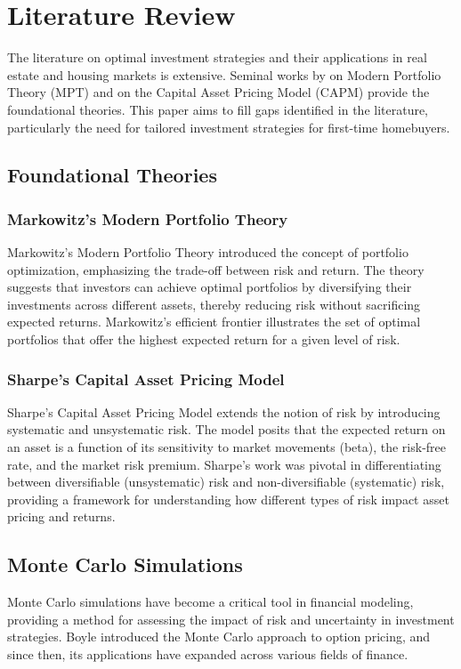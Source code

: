 \section{Literature Review}

The literature on optimal investment strategies and their applications in real estate and housing markets is extensive. Seminal works by \citet{markowitz1952portfolio} on Modern Portfolio Theory (MPT) and \citet{sharpe1964capital} on the Capital Asset Pricing Model (CAPM) provide the foundational theories. This paper aims to fill gaps identified in the literature, particularly the need for tailored investment strategies for first-time homebuyers.

\subsection{Foundational Theories}

\subsubsection{Markowitz's Modern Portfolio Theory}
Markowitz's Modern Portfolio Theory \citep{markowitz1952portfolio} introduced the concept of portfolio optimization, emphasizing the trade-off between risk and return. The theory suggests that investors can achieve optimal portfolios by diversifying their investments across different assets, thereby reducing risk without sacrificing expected returns. Markowitz's efficient frontier illustrates the set of optimal portfolios that offer the highest expected return for a given level of risk.

\subsubsection{Sharpe's Capital Asset Pricing Model}
Sharpe's Capital Asset Pricing Model \citep{sharpe1964capital} extends the notion of risk by introducing systematic and unsystematic risk. The model posits that the expected return on an asset is a function of its sensitivity to market movements (beta), the risk-free rate, and the market risk premium. Sharpe's work was pivotal in differentiating between diversifiable (unsystematic) risk and non-diversifiable (systematic) risk, providing a framework for understanding how different types of risk impact asset pricing and returns.

\subsection{Monte Carlo Simulations}
Monte Carlo simulations have become a critical tool in financial modeling, providing a method for assessing the impact of risk and uncertainty in investment strategies. Boyle \citep{boyle1977options} introduced the Monte Carlo approach to option pricing, and since then, its applications have expanded across various fields of finance.

